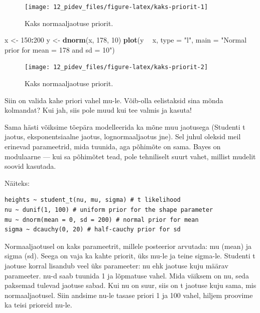 \documentclass[]{book}
\newenvironment{Shaded}{\begin{snugshade}}{\end{snugshade}}
\newcommand{\DataTypeTok}[1]{\textcolor[rgb]{0.13,0.29,0.53}{#1}}
\newcommand{\DecValTok}[1]{\textcolor[rgb]{0.00,0.00,0.81}{#1}}
\newcommand{\KeywordTok}[1]{\textcolor[rgb]{0.13,0.29,0.53}{\textbf{#1}}}
\newcommand{\NormalTok}[1]{#1}
\newcommand{\OperatorTok}[1]{\textcolor[rgb]{0.81,0.36,0.00}{\textbf{#1}}}
\newcommand{\StringTok}[1]{\textcolor[rgb]{0.31,0.60,0.02}{#1}}
\begin{document}
\begin{figure}
\texttt{[image: 12\_pidev\_files/figure-latex/kaks-priorit-1]} \caption{Kaks normaaljaotuse priorit.}\label{fig:kaks-priorit1}
\end{figure}

\begin{Shaded}
\begin{Highlighting}[]
\NormalTok{x <-}\StringTok{ }\DecValTok{150}\OperatorTok{:}\DecValTok{200}
\NormalTok{y <-}\StringTok{ }\KeywordTok{dnorm}\NormalTok{(x, }\DecValTok{178}\NormalTok{, }\DecValTok{10}\NormalTok{)}
\KeywordTok{plot}\NormalTok{(y }\OperatorTok{~}\StringTok{ }\NormalTok{x, }\DataTypeTok{type =} \StringTok{"l"}\NormalTok{, }\DataTypeTok{main =} \StringTok{"Normal prior for mean = 178 and sd = 10"}\NormalTok{)}
\end{Highlighting}
\end{Shaded}

\begin{figure}
\texttt{[image: 12\_pidev\_files/figure-latex/kaks-priorit-2]} \caption{Kaks normaaljaotuse priorit.}\label{fig:kaks-priorit2}
\end{figure}

Siin on valida kahe priori vahel mu-le.
Võib-olla eelistaksid sina mõnda kolmandat?
Kui jah, siis pole muud kui tee valmis ja kasuta!

Sama hästi võiksime tõepära modelleerida ka mõne muu jaotusega (Studenti t jaotus, eksponentsiaalne jaotus, lognormaaljaotus jne).
Sel juhul oleksid meil erinevad parameetrid, mida tuunida, aga põhimõte on sama.
Bayes on modulaarne --- kui sa põhimõtet tead, pole tehniliselt suurt vahet, millist mudelit soovid kasutada.

Näiteks:

\begin{verbatim}
heights ~ student_t(nu, mu, sigma) # t likelihood
nu ~ dunif(1, 100) # uniform prior for the shape parameter
mu ~ dnorm(mean = 0, sd = 200) # normal prior for mean
sigma ~ dcauchy(0, 20) # half-cauchy prior for sd
\end{verbatim}

Normaaljaotusel on kaks parameetrit, millele posteerior arvutada: mu (mean) ja sigma (sd).
Seega on vaja ka kahte priorit, üks mu-le ja teine sigma-le.
Studenti t jaotuse korral lisandub veel üks parameeter: nu ehk jaotuse kuju määrav parameeter.
nu-d saab tuunida 1 ja lõpmatuse vahel.
Mida väiksem on nu, seda paksemad tulevad jaotuse sabad.
Kui nu on suur, siis on t jaotuse kuju sama, mis normaaljaotusel.
Siin andsime nu-le tasase priori 1 ja 100 vahel, hiljem proovime ka teisi prioreid nu-le.
\end{document}
